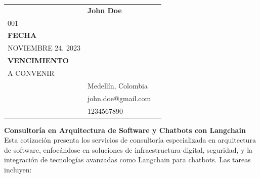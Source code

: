 \documentclass{letter}
\begin{document}
\thispagestyle{empty}

\begin{tabularx}{\textwidth}{l X l}
  \hspace{-8pt} \multirow{5}{*} & \textbf{John Doe} & \hskip12pt\multirow{5}{*}{\begin{tabular}{r}\footnotesize\bf COTIZACIÓN \\[-0.8ex] \footnotesize 001 \\[-0.4ex] \footnotesize\bf FECHA \\[-0.8ex] \footnotesize \MakeUppercase{NOVIEMBRE 24, 2023} \\[-0.4ex] \footnotesize\bf VENCIMIENTO \\[-0.8ex] \footnotesize A CONVENIR \end{tabular}}\hspace{-6pt} \\
                                & Medellín, Colombia               &                                                                                                                                                                                                                                                                                                            \\
                                & john.doe@gmail.com               &                                                                                                                                                                                                                                                                                                            \\
                                & 1234567890                       &                                                                                                                                                                                                                                                                                                            \\
\end{tabularx}

\vspace{1 cm}

\textbf{Consultoría en Arquitectura de Software y Chatbots con Langchain}\\
Esta cotización presenta los servicios de consultoría especializada en arquitectura de software, enfocándose en soluciones de infraestructura digital, seguridad, y la integración de tecnologías avanzadas como Langchain para chatbots. Las tareas incluyen:
\end{document}
